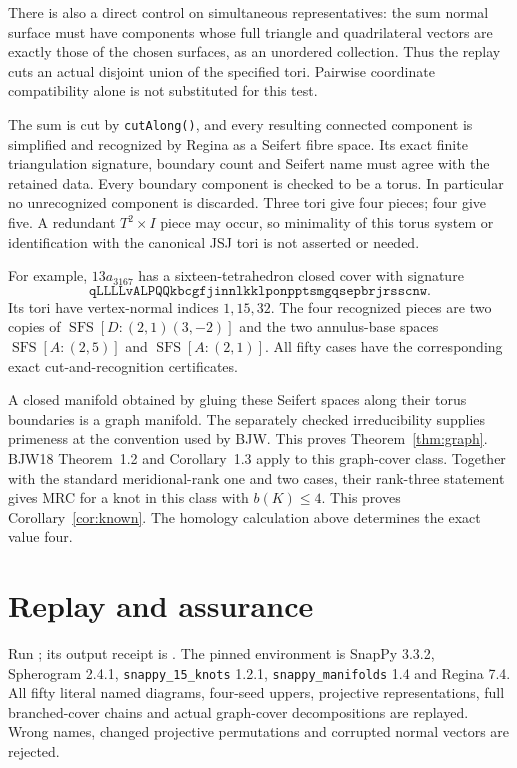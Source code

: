 \documentclass[11pt]{article}
\begin{document}
There is also a direct control on simultaneous representatives:
the sum normal surface must have components whose full triangle and
quadrilateral vectors are exactly those of the chosen surfaces,
as an unordered collection. Thus the replay cuts an actual disjoint
union of the specified tori. Pairwise coordinate compatibility alone
is not substituted for this test.

The sum is cut by \texttt{cutAlong()}, and every resulting connected
component is simplified and recognized by Regina as a Seifert fibre
space. Its exact finite triangulation signature, boundary count and
Seifert name must agree with the retained data. Every boundary component
is checked to be a torus. In particular no unrecognized component is
discarded. Three tori give four pieces; four give five. A redundant
$T^2\times I$ piece may occur, so minimality of this torus system or
identification with the canonical JSJ tori is not asserted or needed.

For example, $13a_{3167}$ has a sixteen-tetrahedron closed cover with
signature
\[
\texttt{qLLLLvALPQQkbcgfjinnlkklponpptsmgqsepbrjrsscnw}.
\]
Its tori have vertex-normal indices $1,15,32$.
The four recognized pieces are two copies of
$\operatorname{SFS}[D:(2,1)(3,-2)]$ and the two annulus-base spaces
$\operatorname{SFS}[A:(2,5)]$ and $\operatorname{SFS}[A:(2,1)]$.
All fifty cases have the corresponding exact cut-and-recognition
certificates.

A closed manifold obtained by gluing these Seifert spaces along their
torus boundaries is a graph manifold. The separately checked
irreducibility supplies primeness at the convention used by BJW.
This proves Theorem~\ref{thm:graph}.
BJW18 Theorem~1.2 and Corollary~1.3
\cite[printed p.~62]{bjw} apply to this graph-cover class.
Together with the standard meridional-rank one and two cases, their
rank-three statement gives MRC for a knot in this class with
$b(K)\le4$. This proves Corollary~\ref{cor:known}.
The homology calculation above determines the exact value four.

\section{Replay and assurance}

Run ; its output receipt is
.
The pinned environment is SnapPy 3.3.2, Spherogram 2.4.1,
\texttt{snappy\_15\_knots} 1.2.1,
\texttt{snappy\_manifolds} 1.4 and Regina 7.4.
All fifty literal named diagrams, four-seed uppers, projective
representations, full branched-cover chains and actual graph-cover
decompositions are replayed. Wrong names, changed projective
permutations and corrupted normal vectors are rejected.
\end{document}

